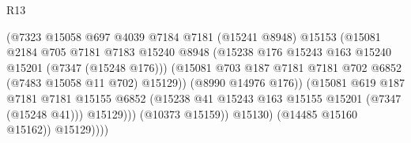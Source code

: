 \begin{lexlean}{R13}
\begin{coremodule}
                                        (@7323
                                          @15058
                                          @697
                                          @4039
                                          @7184
                                          @7181
                                          (@15241 @8948)
                                          @15153
                                          (@15081
                                            @2184
                                            @705
                                            @7181
                                            @7183
                                            @15240
                                            @8948
                                            (@15238
                                              @176
                                              @15243
                                              @163
                                              @15240
                                              @15201
                                              (@7347 (@15248 @176)))
                                            (@15081
                                              @703
                                              @187
                                              @7181
                                              @7181
                                              @702
                                              @6852
                                              (@7483 @15058 @11 @702)
                                              @15129))
                                          (@8990 @14976 @176))
                                        (@15081
                                          @619
                                          @187
                                          @7181
                                          @7181
                                          @15155
                                          @6852
                                          (@15238
                                            @41
                                            @15243
                                            @163
                                            @15155
                                            @15201
                                            (@7347 (@15248 @41)))
                                          @15129)))
                                    (@10373 @15159))
                                  @15130)
                                (@14485 @15160 @15162))
                              @15129))))

\end{coremodule}
\end{lexlean}
